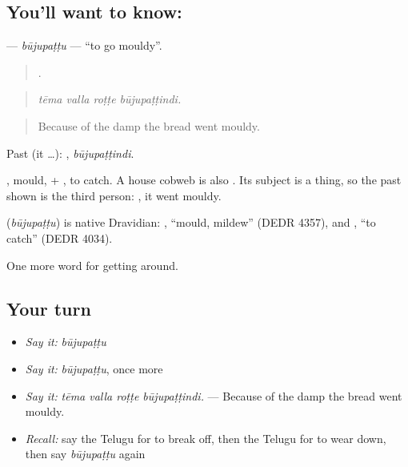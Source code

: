 \subsection*{You'll want to know: }
\textbf{} — \emph{būjupaṭṭu} — \textquotedblleft{}to go mouldy\textquotedblright{}.

\begin{quote}
   .
\end{quote}

\begin{quote}
\emph{tēma valla roṭṭe būjupaṭṭindi.}
\end{quote}

\begin{quote}
Because of the damp the bread went mouldy.
\end{quote}

Past (it …): , \emph{būjupaṭṭindi}.

, mould, + , to catch. A house cobweb is also . Its subject is a thing, so the past shown is the third person: , it went mouldy.

\begin{cousinweb}
\textbf{} (\emph{būjupaṭṭu}) is native Dravidian: , \textquotedblleft{}mould, mildew\textquotedblright{} (DEDR 4357), and , \textquotedblleft{}to catch\textquotedblright{} (DEDR 4034).
\end{cousinweb}

\begin{grammarlens}[title={What you've built}]
One more word for getting around.
\end{grammarlens}

\subsection*{Your turn}
\begin{itemize}
\raggedright
  \item \emph{Say it:} \emph{būjupaṭṭu}
  \item \emph{Say it:} \emph{būjupaṭṭu}, once more
  \item \emph{Say it:} \emph{tēma valla roṭṭe būjupaṭṭindi.} — Because of the damp the bread went mouldy.
  \item \emph{Recall:} say the Telugu for to break off, then the Telugu for to wear down, then say \emph{būjupaṭṭu} again
\end{itemize}

